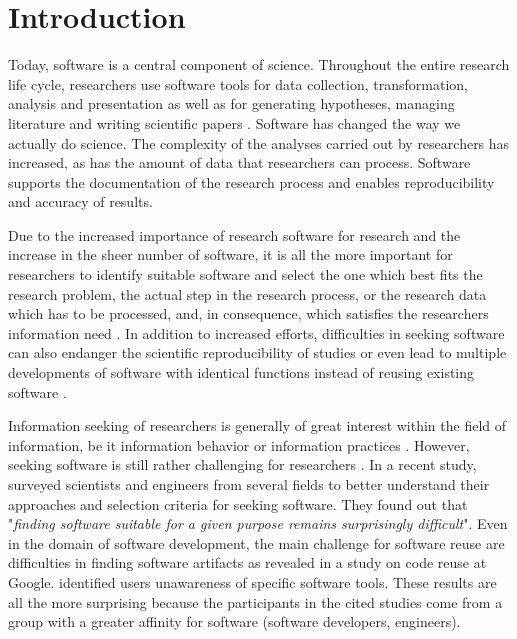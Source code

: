 \documentclass[12pt, a4paper, titlepage, oneside, abstract=true, toc=listof, toc=bibliography, BCOR=1cm]{scrreprt}
\begin{document}
\chapter{Introduction}
Today, software is a central component of science. Throughout the entire research life cycle, researchers use software tools for data collection, transformation, analysis and presentation as well as for generating hypotheses, managing literature and writing scientific papers \citep{Kethers2017, Pan2016, Wolski2017}. Software has changed the way we actually do science. The complexity of the analyses carried out by researchers has increased, as has the amount of data that researchers can process. Software supports the documentation of the research process and enables reproducibility \citep{DallmeierTiessen2016, Waltemath2016} and accuracy of results.

Due to the increased importance of research software for research \citep{Katz2017} and the increase in the sheer number of software, it is all the more important for researchers to identify suitable software and select the one which best fits the research problem, the actual step in the research process, or the research data which has to be processed, and, in consequence, which satisfies the researchers information need \citep{Wilson1994}. In addition to increased efforts, difficulties in seeking software can also endanger the scientific reproducibility of studies or even lead to multiple developments of software with identical functions instead of reusing existing software \citep{Hucka2018}.

Information seeking of researchers is generally of great interest within the field of information, be it information behavior \citep[e.g.][]{Ahmadianyazdi2018, Barrett2005, Campbell2017, Catalano2013, Ellis1993, Hemminger2007, Korobili2011,  Liyana2017, Rimmer2006, RuppSerrano2013, Wang2008} or information practices \citep[e.g.][]{Boyum2015, Bulger2011, Fry2006, Given2018, Roos2015}. However, seeking software is still rather challenging for researchers \citep{Howison2015}. In a recent study, \citet{Hucka2018} surveyed scientists and engineers from several fields to better understand their approaches and selection criteria for seeking software. They found out that "\textit{finding software suitable for a given purpose remains surprisingly difficult}". Even in the domain of software development, the main challenge for software reuse are difficulties in finding software artifacts as \citet{Bauer2014} revealed in a study on code reuse at Google. \citet{Grossman2009} identified users unawareness of specific software tools. These results are all the more surprising because the participants in the cited studies come from a group with a greater affinity for software (software developers, engineers).
\end{document}
